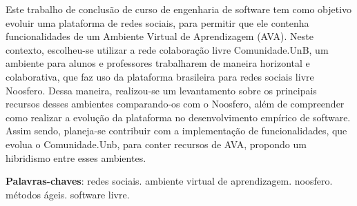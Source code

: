 \begin{resumo}

Este trabalho de conclusão de curso de engenharia de software tem como objetivo evoluir uma plataforma de redes sociais, para permitir que ele contenha funcionalidades de um Ambiente Virtual de Aprendizagem (AVA). Neste contexto, escolheu-se utilizar a rede colaboração livre Comunidade.UnB, um ambiente para alunos e professores trabalharem de maneira horizontal e colaborativa, que faz uso da plataforma brasileira para redes sociais livre Noosfero. Dessa maneira, realizou-se um levantamento sobre os principais recursos desses ambientes comparando-os com o Noosfero, além de compreender como realizar a evolução da plataforma no desenvolvimento empírico de software. Assim sendo, planeja-se contribuir com a implementação de funcionalidades, que evolua o Comunidade.Unb, para conter recursos de AVA, propondo um hibridismo entre esses ambientes.

 \vspace{\onelineskip}
    
 \noindent
 \textbf{Palavras-chaves}: redes sociais. ambiente virtual de aprendizagem. noosfero. métodos ágeis. software livre.
\end{resumo}